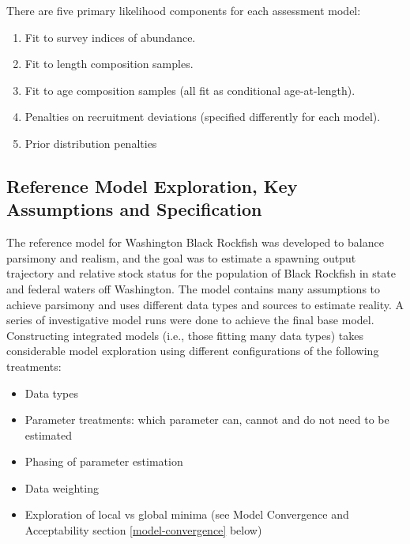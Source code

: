 \documentclass[11pt,
  letterpaper,
]{article}
\providecommand{\tightlist}{%
  \setlength{\itemsep}{0pt}\setlength{\parskip}{0pt}}
\providecommand{\tightlist}{%
  \setlength{\itemsep}{0pt}\setlength{\parskip}{0pt}}
\begin{document}
There are five primary likelihood components for each assessment model:

\begin{enumerate}
\def\labelenumi{\arabic{enumi}.}
\tightlist
\item
  Fit to survey indices of abundance.
\item
  Fit to length composition samples.
\item
  Fit to age composition samples (all fit as conditional age-at-length).
\item
  Penalties on recruitment deviations (specified differently for each model).
\item
  Prior distribution penalties
\end{enumerate}

\hypertarget{reference-model-exploration-key-assumptions-and-specification}{%
\subsection{Reference Model Exploration, Key Assumptions and Specification}\label{reference-model-exploration-key-assumptions-and-specification}}

The reference model for Washington Black Rockfish was developed to balance parsimony and realism, and the goal was to estimate a spawning output trajectory and relative stock status for the population of Black Rockfish in state and federal waters off Washington. The model contains many assumptions to achieve parsimony and uses different data types and sources to estimate reality. A series of investigative model runs were done to achieve the final base model. Constructing integrated models (i.e., those fitting many data types) takes considerable model exploration using different configurations of the following treatments:

\begin{itemize}
\tightlist
\item
  Data types
\item
  Parameter treatments: which parameter can, cannot and do not need to be estimated
\item
  Phasing of parameter estimation
\item
  Data weighting
\item
  Exploration of local vs global minima (see Model Convergence and Acceptability section \ref{model-convergence} below)
\end{itemize}
\end{document}
